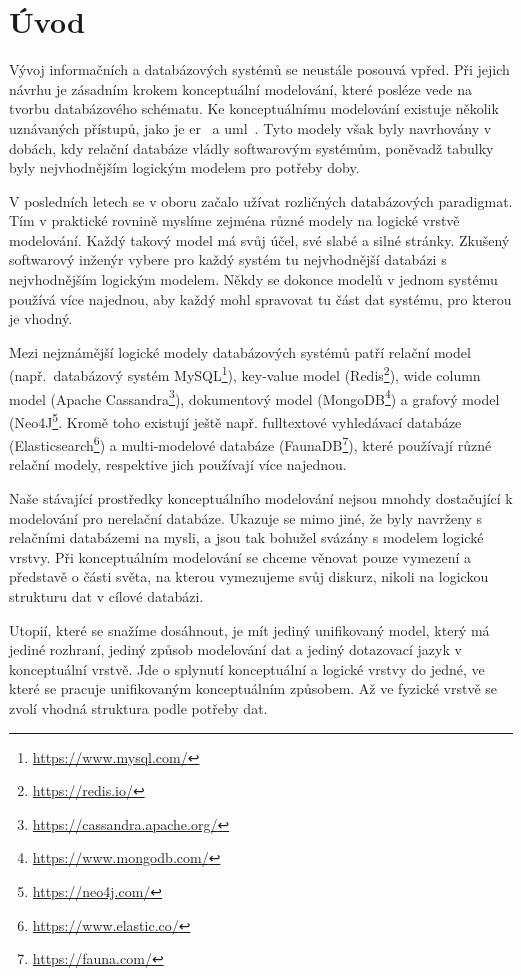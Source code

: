 \chapter*{Úvod}

Vývoj informačních a databázových systémů se neustále posouvá vpřed.
Při jejich návrhu je zásadním krokem konceptuální modelování, které posléze vede na tvorbu databázového schématu.
Ke konceptuálnímu modelování existuje několik uznávaných přístupů, jako je \acrfull{er}~\cite{chen_er_1976} a \acrfull{uml}~\cite{omg_uml_2017}.
Tyto modely však byly navrhovány v dobách, kdy relační databáze vládly softwarovým systémům, poněvadž tabulky byly nejvhodnějším logickým modelem pro potřeby doby.

V posledních letech se v oboru začalo užívat rozličných databázových paradigmat.
Tím v praktické rovnině myslíme zejména různé modely na logické vrstvě modelování.
Každý takový model má svůj účel, své slabé a silné stránky.
Zkušený softwarový inženýr vybere pro každý systém tu nejvhodnější databázi s nejvhodnějším logickým modelem.
Někdy se dokonce modelů v jednom systému používá více najednou, aby každý mohl spravovat tu část dat systému, pro kterou je vhodný.

Mezi nejznámější logické modely databázových systémů patří
relační model (např.~databázový systém MySQL\footnote{\url{https://www.mysql.com/}}),
key-value model (Redis\footnote{\url{https://redis.io/}}),
wide column model (Apache Cassandra\footnote{\url{https://cassandra.apache.org/}}),
dokumentový model (MongoDB\footnote{\url{https://www.mongodb.com/}}) a 
grafový model (Neo4J\footnote{\url{https://neo4j.com/}}.
Kromě toho existují ještě např. fulltextové vyhledávací databáze (Elasticsearch\footnote{\url{https://www.elastic.co/}}) a
multi-modelové databáze (FaunaDB\footnote{\url{https://fauna.com/}}), které používají různé relační modely, respektive jich používají více najednou.

Naše stávající prostředky konceptuálního modelování nejsou mnohdy dostačující k modelování pro nerelační databáze.
Ukazuje se mimo jiné, že byly navrženy s relačními databázemi na mysli, a jsou tak bohužel svázány s modelem logické vrstvy.
Při konceptuálním modelování se chceme věnovat pouze vymezení a představě o části světa, na kterou vymezujeme svůj diskurz, nikoli na logickou strukturu dat v cílové databázi.

Utopií, které se snažíme dosáhnout, je mít jediný unifikovaný model, který má jediné rozhraní, jediný způsob modelování dat a jediný dotazovací jazyk v konceptuální vrstvě.
Jde o splynutí konceptuální a logické vrstvy do jedné, ve které se pracuje unifikovaným konceptuálním způsobem.
Až ve fyzické vrstvě se zvolí vhodná struktura podle potřeby dat.

